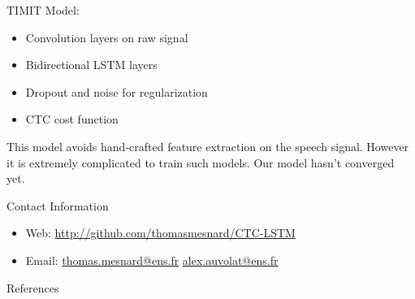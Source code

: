 \documentclass[final]{beamer}
\newlength{\onecolwid}
\newlength{\twocolwid}
\begin{document}
\begin{frame}[t]
\begin{columns}[t]
\begin{column}{\twocolwid}
\begin{columns}[t,totalwidth=\twocolwid]
\begin{column}{\onecolwid}
\begin{block}{TIMIT}
Model:

\begin{itemize}
\item Convolution layers on raw signal
\item Bidirectional LSTM layers
\item Dropout and noise for regularization
\item CTC cost function
\end{itemize}

This model avoids hand-crafted feature extraction on the speech signal. However it is extremely complicated to train such models. Our model hasn't converged yet.

\end{block}




\begin{block}{Contact Information}

\begin{itemize}
\item Web: \url{http://github.com/thomasmesnard/CTC-LSTM}
\item Email: \url{thomas.mesnard@ens.fr}
			 \url{alex.auvolat@ens.fr}
\end{itemize}

\end{block}

\begin{block}{References}

\nocite{*} %
\small{
\vspace{0.75in}}


\end{block}




\end{column}
\end{columns}
\end{column}
\end{columns}
\end{frame}
\end{document}

